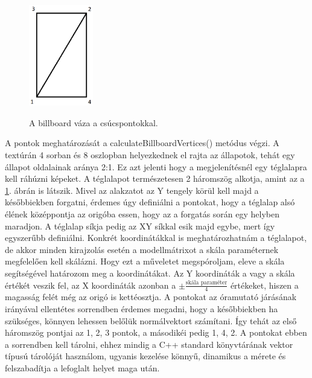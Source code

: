 \begin{figure}
 \caption{A billboard váza a csúcspontokkal.}
 \centering
 \includegraphics[width=0.25\textwidth]{kepek/billboardFrame.png}
 \label{fig:billboardFrame}
\end{figure}
A pontok meghatározását a calculateBillboardVertices() metódus végzi. A textúrán 4 sorban és 8 oszlopban helyezkednek el rajta az állapotok, tehát egy állapot oldalainak aránya 2:1. Ez azt jelenti hogy a megjelenítésnél egy téglalapra kell ráhúzni képeket. A téglalapot természetesen 2 háromszög alkotja, amint az a \ref{fig:billboardFrame}. ábrán is látszik. 
Mivel az alakzatot az Y tengely körül kell majd a későbbiekben forgatni, érdemes úgy definiálni a pontokat, hogy a téglalap alsó élének középpontja az origóba essen, hogy az a forgatás során egy helyben maradjon. A téglalap síkja pedig az XY síkkal esik majd egybe, mert így egyszerűbb definiálni. Konkrét koordinátákkal is meghatározhatnám a téglalapot, de akkor minden kirajzolás esetén a modellmátrixot a skála paraméternek megfelelően kell skálázni. Hogy ezt a műveletet megspóroljam, eleve a skála segítségével határozom meg a koordinátákat. Az Y koordináták a vagy a skála értékét veszik fel, az X koordináták azonban a $\pm \frac{\text{skála paraméter}}{4}$ értékeket, hiszen a magasság felét még az origó is kettéosztja. A pontokat az óramutató járásának irányával ellentétes sorrendben érdemes megadni, hogy a későbbiekben ha szükséges, könnyen lehessen belőlük normálvektort számítani. Így tehát az első háromszög pontjai az 1, 2, 3 pontok, a másodikéi pedig 1, 4, 2. A pontokat ebben a sorrendben kell tárolni, ehhez mindig a C++ standard könyvtárának vektor típusú tárolóját használom, ugyanis kezelése könnyű, dinamikus a mérete és felszabadítja a lefoglalt helyet maga után.

